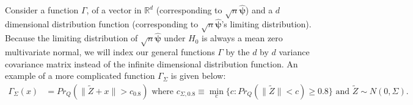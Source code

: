 \documentclass{article}
\newcommand{\vmat}{\Sigma}
\newcommand{\disto}{P}
\newcommand{\rvv}{Z}
\newcommand{\distv}{Q}
\begin{document}
Consider a function $\Gamma$, of a vector in $\mathbb{R}^d$ (corresponding to $\sqrt{n}\hat{\boldsymbol{\psi}}$) and a $d$ dimensional distribution function (corresponding to $\sqrt{n}\hat{\boldsymbol{\psi}}$'s limiting distribution). %
Because the limiting distribution of $\sqrt{n}\hat{\boldsymbol{\psi}}$ under $H_0$ is always a mean zero multivariate normal, we will index our general functions $\Gamma$ by the $d$ by $d$ variance covariance matrix instead of the infinite dimensional distribution function.
An example of a more complicated function $\Gamma_\vmat$ is given below:
\begin{align}
	\Gamma_\vmat(x) &= Pr_\distv(\|\tilde\rvv + x\| > c_{0.8})  \text{ where }  c_{\vmat, 0.8} \equiv \min_{c}\{c : Pr_\distv(\|\tilde\rvv\| < c) \geq 0.8 \} \text{ and } \tilde\rvv \sim N(0, \Sigma). \label{gamma:pow}
\end{align}

\end{document}
